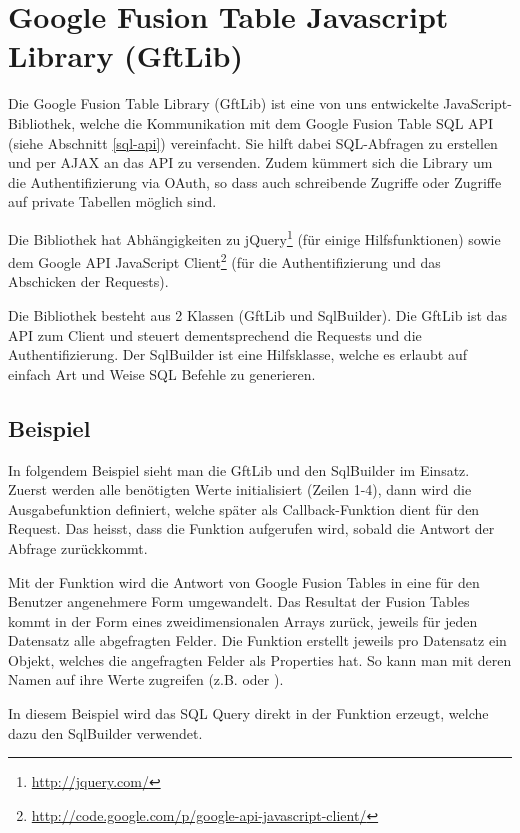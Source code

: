 \section{Google Fusion Table Javascript Library (GftLib)}
\label{gftlib-js}
Die Google Fusion Table Library (GftLib) ist eine von uns entwickelte JavaScript-Bibliothek, welche die Kommunikation mit dem Google Fusion Table SQL API (siehe Abschnitt \ref{sql-api}) vereinfacht. Sie hilft dabei SQL-Abfragen zu erstellen und per \gls{AJAX} an das API zu versenden. Zudem kümmert sich die Library um die Authentifizierung via \gls{OAuth}, so dass auch schreibende Zugriffe oder Zugriffe auf private Tabellen möglich sind.

Die Bibliothek hat Abhängigkeiten zu jQuery\footnote{\url{http://jquery.com/}} (für einige Hilfsfunktionen) sowie dem Google API JavaScript Client\footnote{\url{http://code.google.com/p/google-api-javascript-client/}} (für die Authentifizierung und das Abschicken der Requests).

Die Bibliothek besteht aus 2 Klassen (GftLib und SqlBuilder). Die GftLib ist das API zum Client und steuert dementsprechend die Requests und die Authentifizierung. Der SqlBuilder ist eine Hilfsklasse, welche es erlaubt auf einfach Art und Weise SQL Befehle zu generieren.

\subsection{Beispiel}
In folgendem Beispiel sieht man die GftLib und den SqlBuilder im Einsatz. Zuerst werden alle benötigten Werte initialisiert (Zeilen 1-4), dann wird die Ausgabefunktion  definiert, welche später als Callback-Funktion dient für den Request. Das heisst, dass die Funktion aufgerufen wird, sobald die Antwort der Abfrage zurückkommt. 

Mit der Funktion  wird die Antwort von Google Fusion Tables in eine für den Benutzer angenehmere Form umgewandelt. Das Resultat der Fusion Tables kommt in der Form eines zweidimensionalen Arrays zurück, jeweils für jeden Datensatz alle abgefragten Felder. Die Funktion erstellt jeweils pro Datensatz ein Objekt, welches die angefragten Felder als Properties hat. So kann man mit deren Namen auf ihre Werte zugreifen (z.B.  oder ).

In diesem Beispiel wird das SQL Query direkt in der Funktion  erzeugt, welche dazu den SqlBuilder verwendet.


